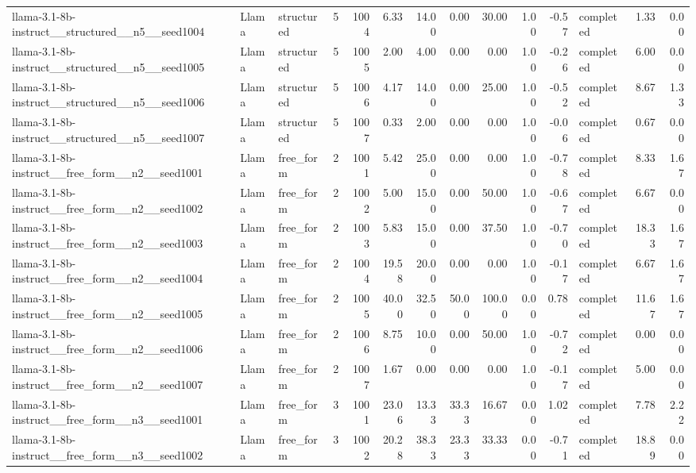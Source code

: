 \begin{longtable}{lllrrrrrrrrlrr}
llama-3.1-8b-instruct\_\_structured\_\_n5\_\_seed1004 & Llama & structured & 5 & 1004 & 6.33 & 14.00 & 0.00 & 30.00 & 1.00 & -0.57 & completed & 1.33 & 0.00 \\
llama-3.1-8b-instruct\_\_structured\_\_n5\_\_seed1005 & Llama & structured & 5 & 1005 & 2.00 & 4.00 & 0.00 & 0.00 & 1.00 & -0.26 & completed & 6.00 & 0.00 \\
llama-3.1-8b-instruct\_\_structured\_\_n5\_\_seed1006 & Llama & structured & 5 & 1006 & 4.17 & 14.00 & 0.00 & 25.00 & 1.00 & -0.52 & completed & 8.67 & 1.33 \\
llama-3.1-8b-instruct\_\_structured\_\_n5\_\_seed1007 & Llama & structured & 5 & 1007 & 0.33 & 2.00 & 0.00 & 0.00 & 1.00 & -0.06 & completed & 0.67 & 0.00 \\
llama-3.1-8b-instruct\_\_free\_form\_\_n2\_\_seed1001 & Llama & free\_form & 2 & 1001 & 5.42 & 25.00 & 0.00 & 0.00 & 1.00 & -0.78 & completed & 8.33 & 1.67 \\
llama-3.1-8b-instruct\_\_free\_form\_\_n2\_\_seed1002 & Llama & free\_form & 2 & 1002 & 5.00 & 15.00 & 0.00 & 50.00 & 1.00 & -0.67 & completed & 6.67 & 0.00 \\
llama-3.1-8b-instruct\_\_free\_form\_\_n2\_\_seed1003 & Llama & free\_form & 2 & 1003 & 5.83 & 15.00 & 0.00 & 37.50 & 1.00 & -0.70 & completed & 18.33 & 1.67 \\
llama-3.1-8b-instruct\_\_free\_form\_\_n2\_\_seed1004 & Llama & free\_form & 2 & 1004 & 19.58 & 20.00 & 0.00 & 0.00 & 1.00 & -0.17 & completed & 6.67 & 1.67 \\
llama-3.1-8b-instruct\_\_free\_form\_\_n2\_\_seed1005 & Llama & free\_form & 2 & 1005 & 40.00 & 32.50 & 50.00 & 100.00 & 0.00 & 0.78 & completed & 11.67 & 1.67 \\
llama-3.1-8b-instruct\_\_free\_form\_\_n2\_\_seed1006 & Llama & free\_form & 2 & 1006 & 8.75 & 10.00 & 0.00 & 50.00 & 1.00 & -0.72 & completed & 0.00 & 0.00 \\
llama-3.1-8b-instruct\_\_free\_form\_\_n2\_\_seed1007 & Llama & free\_form & 2 & 1007 & 1.67 & 0.00 & 0.00 & 0.00 & 1.00 & -0.17 & completed & 5.00 & 0.00 \\
llama-3.1-8b-instruct\_\_free\_form\_\_n3\_\_seed1001 & Llama & free\_form & 3 & 1001 & 23.06 & 13.33 & 33.33 & 16.67 & 0.00 & 1.02 & completed & 7.78 & 2.22 \\
llama-3.1-8b-instruct\_\_free\_form\_\_n3\_\_seed1002 & Llama & free\_form & 3 & 1002 & 20.28 & 38.33 & 23.33 & 33.33 & 0.00 & -0.71 & completed & 18.89 & 0.00 \\

\end{longtable}
